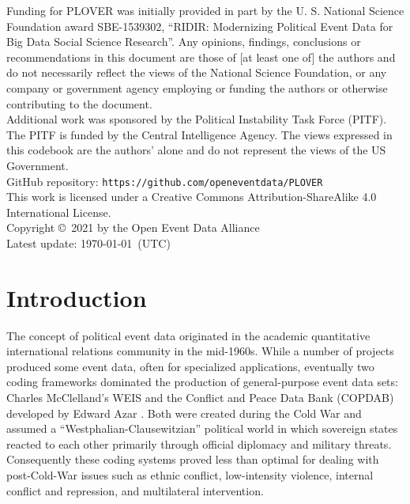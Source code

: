\documentclass[11pt]{report}
\newcommand{\txt}[1]{\texttt{#1}}
\begin{document}
\noindent Funding for PLOVER was initially provided in part by the U. S. National Science Foundation award SBE-1539302, ``RIDIR: Modernizing Political Event Data for Big Data Social Science Research''. Any opinions, findings, conclusions or recommendations in this document are those of [at least one of] the authors and do not necessarily reflect the views of the National Science Foundation, or any company or government agency employing or funding the authors or otherwise contributing to the document.\\

\noindent Additional work was sponsored by the Political Instability Task Force (PITF). The PITF is funded by the Central Intelligence Agency. The views expressed in this codebook are the authors' alone and do not
represent the views of the US Government.\\

\noindent GitHub repository: \txt{https://github.com/openeventdata/PLOVER}\\


\noindent This work is licensed under a Creative Commons Attribution-ShareAlike 4.0 International License.\\

\noindent  Copyright \copyright ~2021 by the Open Event Data Alliance \\

\noindent Latest update: \today~(UTC)


\chapter{Introduction}

The concept of political event data originated in the academic quantitative international relations community in the mid-1960s. While a number of projects produced some event data, often for specialized applications, eventually two coding frameworks dominated the production of general-purpose event data sets: Charles McClelland's WEIS \citep{McClelland67,McClelland76}  and the Conflict and Peace Data Bank (COPDAB) developed by Edward Azar \citep{AzarSloan75, Azar80, Azar82}. Both were created during the Cold War and assumed a ``Westphalian-Clausewitzian'' political world in which sovereign states reacted to each other primarily through official diplomacy
and military threats. Consequently these coding systems proved less than optimal for dealing with post-Cold-War issues such as ethnic conflict, low-intensity violence, internal conflict and repression, and multilateral intervention. 
\end{document}
